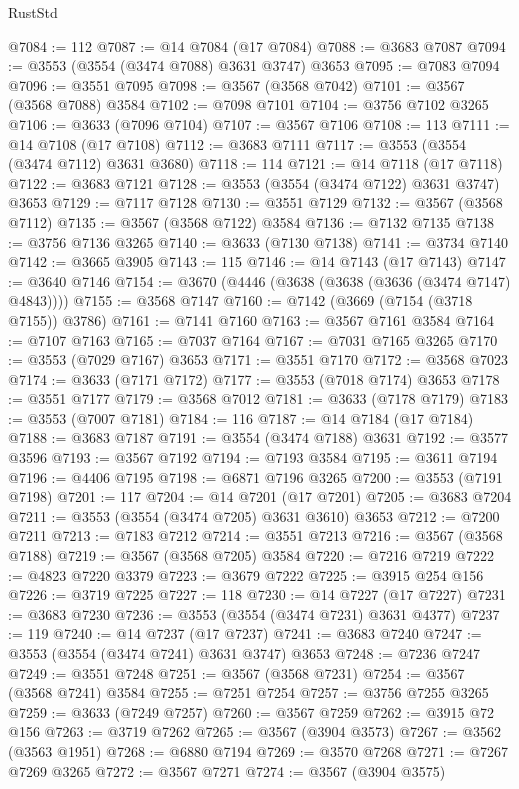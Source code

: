 \begin{lexlean}{RustStd}
\begin{coremodule}
@7084 := 112
@7087 := @14 @7084 (@17 @7084)
@7088 := @3683 @7087
@7094 := @3553 (@3554 (@3474 @7088) @3631 @3747) @3653
@7095 := @7083 @7094
@7096 := @3551 @7095
@7098 := @3567 (@3568 @7042)
@7101 := @3567 (@3568 @7088) @3584
@7102 := @7098 @7101
@7104 := @3756 @7102 @3265
@7106 := @3633 (@7096 @7104)
@7107 := @3567 @7106
@7108 := 113
@7111 := @14 @7108 (@17 @7108)
@7112 := @3683 @7111
@7117 := @3553 (@3554 (@3474 @7112) @3631 @3680)
@7118 := 114
@7121 := @14 @7118 (@17 @7118)
@7122 := @3683 @7121
@7128 := @3553 (@3554 (@3474 @7122) @3631 @3747) @3653
@7129 := @7117 @7128
@7130 := @3551 @7129
@7132 := @3567 (@3568 @7112)
@7135 := @3567 (@3568 @7122) @3584
@7136 := @7132 @7135
@7138 := @3756 @7136 @3265
@7140 := @3633 (@7130 @7138)
@7141 := @3734 @7140
@7142 := @3665 @3905
@7143 := 115
@7146 := @14 @7143 (@17 @7143)
@7147 := @3640 @7146
@7154 := @3670 (@4446 (@3638 (@3638 (@3636 (@3474 @7147) @4843))))
@7155 := @3568 @7147
@7160 := @7142 (@3669 (@7154 (@3718 @7155)) @3786)
@7161 := @7141 @7160
@7163 := @3567 @7161 @3584
@7164 := @7107 @7163
@7165 := @7037 @7164
@7167 := @7031 @7165 @3265
@7170 := @3553 (@7029 @7167) @3653
@7171 := @3551 @7170
@7172 := @3568 @7023
@7174 := @3633 (@7171 @7172)
@7177 := @3553 (@7018 @7174) @3653
@7178 := @3551 @7177
@7179 := @3568 @7012
@7181 := @3633 (@7178 @7179)
@7183 := @3553 (@7007 @7181)
@7184 := 116
@7187 := @14 @7184 (@17 @7184)
@7188 := @3683 @7187
@7191 := @3554 (@3474 @7188) @3631
@7192 := @3577 @3596
@7193 := @3567 @7192
@7194 := @7193 @3584
@7195 := @3611 @7194
@7196 := @4406 @7195
@7198 := @6871 @7196 @3265
@7200 := @3553 (@7191 @7198)
@7201 := 117
@7204 := @14 @7201 (@17 @7201)
@7205 := @3683 @7204
@7211 := @3553 (@3554 (@3474 @7205) @3631 @3610) @3653
@7212 := @7200 @7211
@7213 := @7183 @7212
@7214 := @3551 @7213
@7216 := @3567 (@3568 @7188)
@7219 := @3567 (@3568 @7205) @3584
@7220 := @7216 @7219
@7222 := @4823 @7220 @3379
@7223 := @3679 @7222
@7225 := @3915 @254 @156
@7226 := @3719 @7225
@7227 := 118
@7230 := @14 @7227 (@17 @7227)
@7231 := @3683 @7230
@7236 := @3553 (@3554 (@3474 @7231) @3631 @4377)
@7237 := 119
@7240 := @14 @7237 (@17 @7237)
@7241 := @3683 @7240
@7247 := @3553 (@3554 (@3474 @7241) @3631 @3747) @3653
@7248 := @7236 @7247
@7249 := @3551 @7248
@7251 := @3567 (@3568 @7231)
@7254 := @3567 (@3568 @7241) @3584
@7255 := @7251 @7254
@7257 := @3756 @7255 @3265
@7259 := @3633 (@7249 @7257)
@7260 := @3567 @7259
@7262 := @3915 @72 @156
@7263 := @3719 @7262
@7265 := @3567 (@3904 @3573)
@7267 := @3562 (@3563 @1951)
@7268 := @6880 @7194
@7269 := @3570 @7268
@7271 := @7267 @7269 @3265
@7272 := @3567 @7271
@7274 := @3567 (@3904 @3575)

\end{coremodule}
\end{lexlean}
